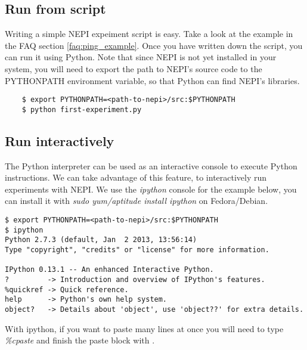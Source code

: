 \subsection{Run from script}

Writing a simple NEPI expeiment script is easy.
Take a look at the example in the FAQ section \ref{faq:ping_example}.
Once you have written down the script, you can run it using
Python. Note that since NEPI is not yet installed in your system,
you will need to export the path to NEPI's source code to 
the PYTHONPATH environment variable, so that Python can find
NEPI's libraries.

\begingroup
    \fontsize{10pt}{12pt}\selectfont

\begin{verbatim}
    $ export PYTHONPATH=<path-to-nepi>/src:$PYTHONPATH
    $ python first-experiment.py 
\end{verbatim}

\endgroup

\subsection{Run interactively}

The Python interpreter can be used as an interactive console to execute 
Python instructions.
We can take advantage of this feature, to interactively run experiments
with NEPI. We  use the \textit{ipython} console for the example below, 
you can install it with \textit{sudo yum/aptitude install ipython} on 
Fedora/Debian.

\begingroup
    \fontsize{10pt}{12pt}\selectfont

\begin{verbatim}
$ export PYTHONPATH=<path-to-nepi>/src:$PYTHONPATH
$ ipython
Python 2.7.3 (default, Jan  2 2013, 13:56:14) 
Type "copyright", "credits" or "license" for more information.

IPython 0.13.1 -- An enhanced Interactive Python.
?         -> Introduction and overview of IPython's features.
%quickref -> Quick reference.
help      -> Python's own help system.
object?   -> Details about 'object', use 'object??' for extra details.

\end{verbatim}

\endgroup

With ipython, if you want to paste many lines at once you will need to type
\emph{\%cpaste} and finish the paste block with \emph{\-\-}.

